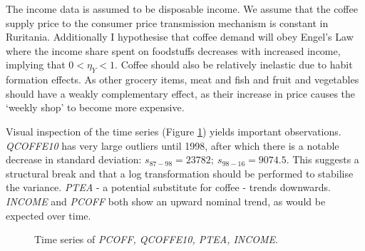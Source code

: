 \documentclass[12pt]{article}
\begin{document}
The income data is assumed to be disposable income. We assume that the coffee supply price to the consumer price transmission mechanism is constant in Ruritania. Additionally I hypothesise that coffee demand will obey Engel's Law where the income share spent on foodstuffs decreases with increased income, implying that \(0<\eta_Y<1\). Coffee should also be relatively inelastic due to habit formation effects. As other grocery items, meat and fish and fruit and vegetables should have a weakly complementary effect, as their increase in price causes the `weekly shop' to become more expensive.

Visual inspection of the time series (Figure \ref{fig:summstats}) yields important observations. \emph{QCOFFE10} has very large outliers until 1998, after which there is a notable decrease in standard deviation: \(s_{87-98}=23782; \: s_{98-16}=9074.5\). This  suggests a structural break and that a log transformation should be performed to stabilise the variance. %
\emph{PTEA} - a potential substitute for coffee -  trends downwards. \emph{INCOME} and \emph{PCOFF} both show an upward nominal trend, as would be expected over time. 
\begin{figure}[!htb]
	\caption{\label{fig:summstats} Time series of \emph{PCOFF, QCOFFE10, PTEA, INCOME}.}
\end{figure}
\\

\end{document}
